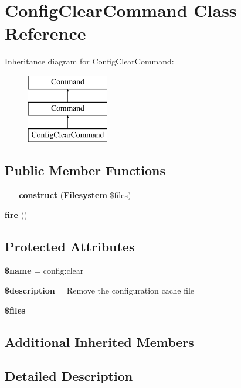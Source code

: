 \section{Config\+Clear\+Command Class Reference}
\label{class_illuminate_1_1_foundation_1_1_console_1_1_config_clear_command}
Inheritance diagram for Config\+Clear\+Command\+:\begin{figure}[H]
\begin{center}
\leavevmode
\includegraphics[height=3.000000cm]{class_illuminate_1_1_foundation_1_1_console_1_1_config_clear_command}
\end{center}
\end{figure}
\subsection*{Public Member Functions}
\begin{DoxyCompactItemize}
\item 
{\bf \+\_\+\+\_\+construct} ({\bf Filesystem} \$files)
\item 
{\bf fire} ()
\end{DoxyCompactItemize}
\subsection*{Protected Attributes}
\begin{DoxyCompactItemize}
\item 
{\bf \$name} = \textquotesingle{}config\+:clear\textquotesingle{}
\item 
{\bf \$description} = \textquotesingle{}Remove the configuration cache file\textquotesingle{}
\item 
{\bf \$files}
\end{DoxyCompactItemize}
\subsection*{Additional Inherited Members}


\subsection{Detailed Description}


